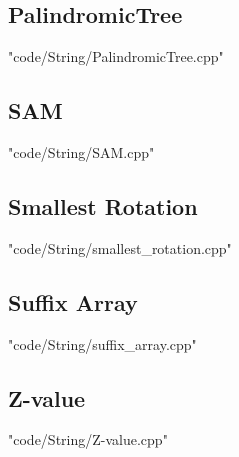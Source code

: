 \documentclass[landscape, 8pt,twocolumn,oneside, a4paper]{article}
\begin{document}
\subsection{PalindromicTree}
 {"code/String/PalindromicTree.cpp"}
\subsection{SAM}
 {"code/String/SAM.cpp"}
\subsection{Smallest Rotation}
 {"code/String/smallest_rotation.cpp"}
\subsection{Suffix Array}
 {"code/String/suffix_array.cpp"}
\subsection{Z-value}
 {"code/String/Z-value.cpp"}
\end{document}
